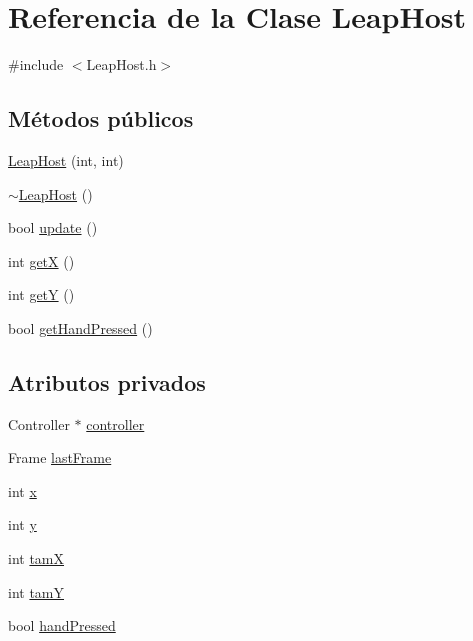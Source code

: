 \hypertarget{class_leap_host}{}\section{Referencia de la Clase Leap\+Host}
\label{class_leap_host}


{\ttfamily \#include $<$Leap\+Host.\+h$>$}

\subsection*{Métodos públicos}
\begin{DoxyCompactItemize}
\item 
\hyperlink{class_leap_host_ad2e24ae715436ae770dd7b1f932f42d2}{Leap\+Host} (int, int)
\item 
\hyperlink{class_leap_host_aa6cf3fc937caec91b6815c907beb9729}{$\sim$\+Leap\+Host} ()
\item 
bool \hyperlink{class_leap_host_ae4bb03b62cdca58bf058b32cb1081088}{update} ()
\item 
int \hyperlink{class_leap_host_a78e0debb727f871554f42553355a4f69}{get\+X} ()
\item 
int \hyperlink{class_leap_host_aca9d2c5b1a0f77b34422675d065b10ec}{get\+Y} ()
\item 
bool \hyperlink{class_leap_host_adc8373acc14ffc67ea15fe18b78978ba}{get\+Hand\+Pressed} ()
\end{DoxyCompactItemize}
\subsection*{Atributos privados}
\begin{DoxyCompactItemize}
\item 
Controller $\ast$ \hyperlink{class_leap_host_a2be5804ff7c86c8bea4b486a153b9d51}{controller}
\item 
Frame \hyperlink{class_leap_host_a629b7838aa0f5729a246570074753f63}{last\+Frame}
\item 
int \hyperlink{class_leap_host_aeaae3c8c471a14f4576b8af34c44d6e8}{x}
\item 
int \hyperlink{class_leap_host_a29854b6d8e1891c89cad39a74fb0368b}{y}
\item 
int \hyperlink{class_leap_host_a6daf0e9ddbb4d368a8a671deb52b545e}{tam\+X}
\item 
int \hyperlink{class_leap_host_a48b7a2dc444cb86b57015322b44a5c58}{tam\+Y}
\item 
bool \hyperlink{class_leap_host_a466dd0da09e74687f993ecdd77a19497}{hand\+Pressed}
\end{DoxyCompactItemize}


